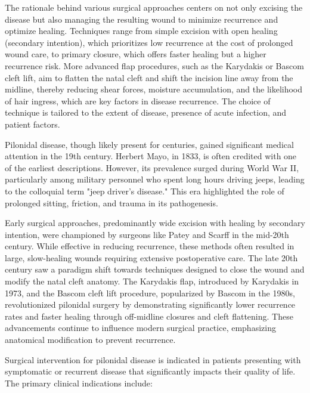 The rationale behind various surgical approaches centers on not only excising the disease but also managing the resulting wound to minimize recurrence and optimize healing. Techniques range from simple excision with open healing (secondary intention), which prioritizes low recurrence at the cost of prolonged wound care, to primary closure, which offers faster healing but a higher recurrence risk. More advanced flap procedures, such as the Karydakis or Bascom cleft lift, aim to flatten the natal cleft and shift the incision line away from the midline, thereby reducing shear forces, moisture accumulation, and the likelihood of hair ingress, which are key factors in disease recurrence. The choice of technique is tailored to the extent of disease, presence of acute infection, and patient factors.

Pilonidal disease, though likely present for centuries, gained significant medical attention in the 19th century. Herbert Mayo, in 1833, is often credited with one of the earliest descriptions. However, its prevalence surged during World War II, particularly among military personnel who spent long hours driving jeeps, leading to the colloquial term "jeep driver's disease." This era highlighted the role of prolonged sitting, friction, and trauma in its pathogenesis.

Early surgical approaches, predominantly wide excision with healing by secondary intention, were championed by surgeons like Patey and Scarff in the mid-20th century. While effective in reducing recurrence, these methods often resulted in large, slow-healing wounds requiring extensive postoperative care. The late 20th century saw a paradigm shift towards techniques designed to close the wound and modify the natal cleft anatomy. The Karydakis flap, introduced by Karydakis in 1973, and the Bascom cleft lift procedure, popularized by Bascom in the 1980s, revolutionized pilonidal surgery by demonstrating significantly lower recurrence rates and faster healing through off-midline closures and cleft flattening. These advancements continue to influence modern surgical practice, emphasizing anatomical modification to prevent recurrence.

Surgical intervention for pilonidal disease is indicated in patients presenting with symptomatic or recurrent disease that significantly impacts their quality of life. The primary clinical indications include:

